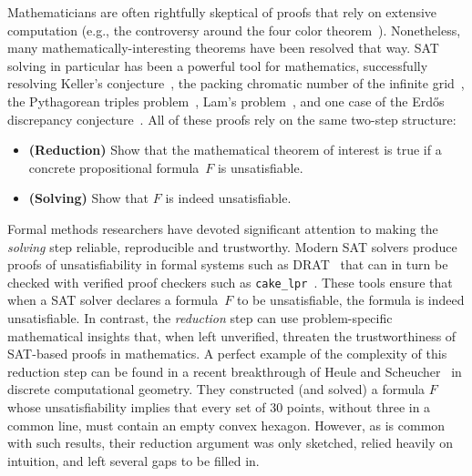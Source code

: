 Mathematicians are often rightfully skeptical of proofs that rely on extensive computation (e.g., the controversy around the four color theorem~\cite{Walters2004ItAT}).
Nonetheless, many mathematically-interesting theorems have been resolved that way.
SAT solving in particular has been a powerful tool for mathematics, successfully resolving
Keller's conjecture~\cite{brakensiek2023resolution},
the packing chromatic number of the infinite grid~\cite{Subercaseaux_Heule_2023},
the Pythagorean triples problem~\cite{Heule_2016},
Lam's problem~\cite{21bright_sat_based_resolution_lams_problem},
and one case of the Erd\H{o}s discrepancy conjecture~\cite{konev2014sat}.
All of these proofs rely on the same two-step structure:
\begin{itemize}
\item \textbf{(Reduction)} Show that the mathematical theorem of interest is true if a concrete propositional formula~$F$ is unsatisfiable.
\item \textbf{(Solving)} Show that $F$ is indeed unsatisfiable.
\end{itemize}


Formal methods researchers have devoted significant attention to making the \emph{solving} step reliable, reproducible and trustworthy.
Modern SAT solvers produce proofs of unsatisfiability in formal systems
such as DRAT~\cite{drat-trim14}
that can in turn be checked with verified proof checkers
such as \texttt{cake\_lpr}~\cite{tanVerifiedPropagationRedundancy2023}. 
These tools ensure that when a SAT solver declares a formula~$F$ to be unsatisfiable, the formula is indeed unsatisfiable.
In contrast, the \emph{reduction} step can use problem-specific mathematical insights that, when left unverified, threaten the trustworthiness of SAT-based proofs in mathematics. 
A perfect example of the complexity of this reduction step can be found in a recent breakthrough of Heule and Scheucher~\cite{emptyHexagonNumber} in discrete computational geometry. 
They constructed (and solved) a formula $F$ whose unsatisfiability implies that every set of 30 points, without three in a common line, must contain an empty convex hexagon.
However, as is common with such results, their reduction argument was only sketched, relied heavily on intuition,
and left several gaps to be filled in.
 

